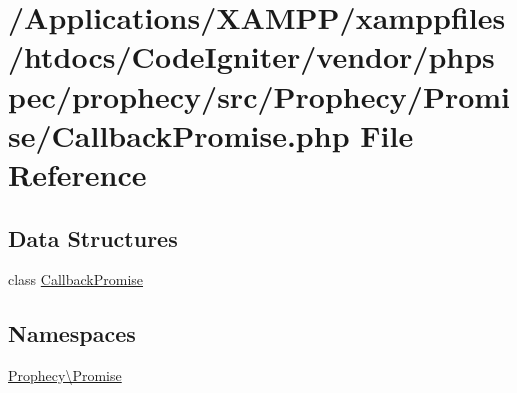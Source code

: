 \hypertarget{_callback_promise_8php}{}\section{/\+Applications/\+X\+A\+M\+P\+P/xamppfiles/htdocs/\+Code\+Igniter/vendor/phpspec/prophecy/src/\+Prophecy/\+Promise/\+Callback\+Promise.php File Reference}
\label{_callback_promise_8php}
\subsection*{Data Structures}
\begin{DoxyCompactItemize}
\item 
class \mbox{\hyperlink{class_prophecy_1_1_promise_1_1_callback_promise}{Callback\+Promise}}
\end{DoxyCompactItemize}
\subsection*{Namespaces}
\begin{DoxyCompactItemize}
\item 
 \mbox{\hyperlink{namespace_prophecy_1_1_promise}{Prophecy\textbackslash{}\+Promise}}
\end{DoxyCompactItemize}
